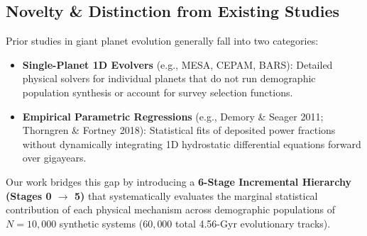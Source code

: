 \subsection{Novelty \& Distinction from Existing Studies}
Prior studies in giant planet evolution generally fall into two categories:
\begin{itemize}
    \item \textbf{Single-Planet 1D Evolvers} (e.g., MESA, CEPAM, BARS): Detailed physical solvers for individual planets that do not run demographic population synthesis or account for survey selection functions.
    \item \textbf{Empirical Parametric Regressions} (e.g., Demory \& Seager 2011; Thorngren \& Fortney 2018): Statistical fits of deposited power fractions without dynamically integrating 1D hydrostatic differential equations forward over gigayears.
\end{itemize}

Our work bridges this gap by introducing a \textbf{6-Stage Incremental Hierarchy (Stages 0 $\to$ 5)} that systematically evaluates the marginal statistical contribution of each physical mechanism across demographic populations of $N = 10,000$ synthetic systems ($60,000$ total 4.56-Gyr evolutionary tracks).
